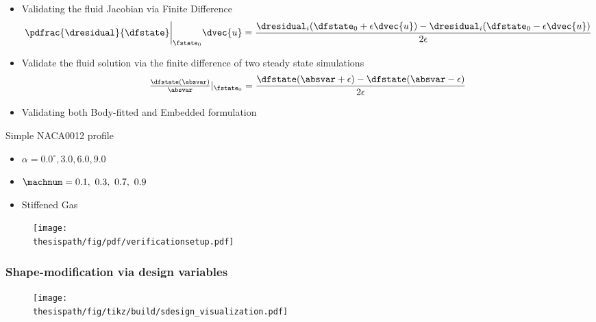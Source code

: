 \begin{frame}

\begin{itemize}
\item Validating the fluid Jacobian via Finite Difference
\begin{align*}
\pdfrac{\dresidual}{\dfstate}\bigg\rvert_{\fstate_0}\dvec{u}=\frac{\dresidual_i(\dfstate_0+\epsilon\dvec{u})-\dresidual_i(\dfstate_0-\epsilon\dvec{u})}{2\epsilon}
\end{align*}
\item Validate the fluid solution via the finite difference of two steady state simulations
\begin{align*}
\tfrac{\dfstate(\absvar)}{\absvar}\rvert_{\fstate_0}=\frac{\dfstate(\absvar+\epsilon)-\dfstate(\absvar-\epsilon)}{2 \epsilon}
\end{align*}
\item Validating both Body-fitted and Embedded formulation
\end{itemize}
\end{frame}



\begin{frame}
Simple NACA0012 profile

\begin{itemize}
\item $\alpha=0.0^{\circ}, 3.0, 6.0, 9.0$
\item $\machnum=0.1,~0.3,~0.7,~0.9$
\item Stiffened Gas
\end{itemize}
\begin{figure}
\texttt{[image: \\thesispath/fig/pdf/verificationsetup.pdf]}
\end{figure}

\end{frame}



\begin{frame}
\frametitle{Shape-modification via design variables}
\begin{figure}
\texttt{[image: \\thesispath/fig/tikz/build/sdesign\_visualization.pdf]}
\end{figure}
\end{frame}



